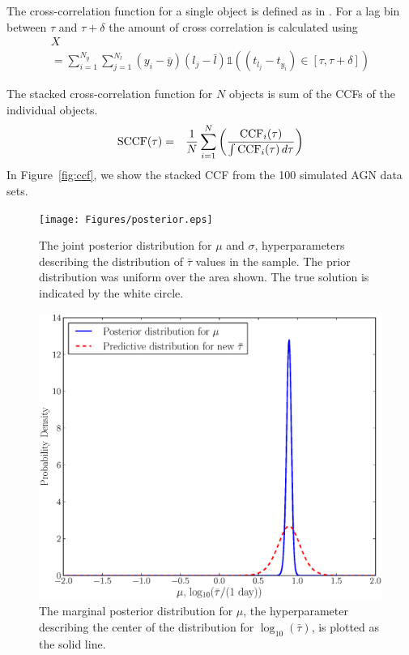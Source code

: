 \documentclass[useAMS,usenatbib]{mn2e}
\begin{document}
The cross-correlation function for a single object is defined as
in \citet{2012MNRAS.427.2701F}. For a lag bin between $\tau$ and $\tau + \delta$
the amount of cross correlation is calculated using
\begin{eqnarray}
X \\= \sum_{i=1}^{N_y}\sum_{j=1}^{N_l}
\left(y_i - \bar{y}\right)
\left(l_j - \bar{l}\right)
\mathds{1}\left((t_{l_j} - t_{y_i}) \in [\tau, \tau + \delta]\right)
\end{eqnarray}

The stacked cross-correlation function for $N$ objects is sum of the CCFs
of the individual objects.
\begin{eqnarray}
\textnormal{SCCF}(\tau) &=&
\frac{1}{N} \sum_{i=1}^N
\left(
\frac{\textnormal{CCF}_i(\tau)}{\int \textnormal{CCF}_i(\tau) \, d\tau}
\right)
\end{eqnarray}
In Figure~\ref{fig:ccf},
we show the stacked CCF from the 100 simulated AGN data sets.

\begin{figure}
\begin{center}
\texttt{[image: Figures/posterior.eps]}
\caption{The joint posterior distribution for $\mu$ and $\sigma$, hyperparameters
describing the distribution of $\bar{\tau}$ values in the sample. The prior
distribution was uniform over the area shown.
The true solution is indicated by the white circle.\label{fig:posterior}}
\end{center}
\end{figure}

\begin{figure}
\begin{center}
\includegraphics[scale=0.35]{Figures/posterior2.eps}
\caption{The marginal posterior distribution for $\mu$, the 
hyperparameter describing the center of the distribution for
$\log_{10}\left(\bar{\tau}\right)$, is plotted as the solid line.
\label{fig:posterior2}}
\end{center}
\end{figure}
\end{document}
